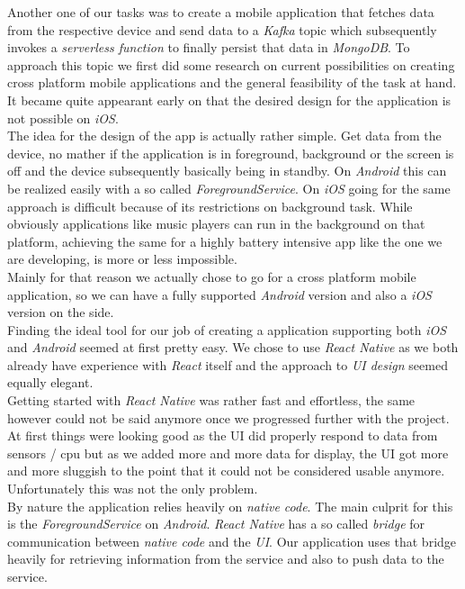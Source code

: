\documentclass{article}
\begin{document}
  Another one of our tasks was to create a mobile application that fetches data from the respective device and send data to a \textit{Kafka} topic which subsequently invokes a \textit{serverless function} to finally persist that data in \textit{MongoDB}. To approach this topic we first did some research on current possibilities on creating cross platform mobile applications and the general feasibility of the task at hand. It became quite appearant early on that the desired design for the application is not possible on \textit{iOS}. \\
  The idea for the design of the app is actually rather simple. Get data from the device, no mather if the application is in foreground, background or the screen is off and the device subsequently basically being in standby.
  On \textit{Android} this can be realized easily with a so called \textit{ForegroundService}. On \textit{iOS} going for the same approach is difficult because of its restrictions on background task. While obviously applications like music players can run in the background on that platform, achieving the same for a highly battery intensive app like the one we are developing, is more or less impossible. \\
  Mainly for that reason we actually chose to go for a cross platform mobile application, so we can have a fully supported \textit{Android} version and also a \textit{iOS} version on the side. \\
  Finding the ideal tool for our job of creating a application supporting both \textit{iOS} and \textit{Android} seemed at first pretty easy. We chose to use \textit{React Native} as we both already have experience with \textit{React} itself and the approach to \textit{UI design} seemed equally elegant. \\
  Getting started with \textit{React Native} was rather fast and effortless, the same however could not be said anymore once we progressed further with the project. At first things were looking good as the UI did properly respond to data from sensors / cpu but as we added more and more data for display, the UI got more and more sluggish to the point that it could not be considered usable anymore. Unfortunately this was not the only problem. \\
  By nature the application relies heavily on \textit{native code}. The main culprit for this is the \textit{ForegroundService} on \textit{Android}. \textit{React Native} has a so called \textit{bridge} for communication between \textit{native code} and the \textit{UI}. Our application uses that bridge heavily for retrieving information from the service and also to push data to the service. \\
\end{document}
